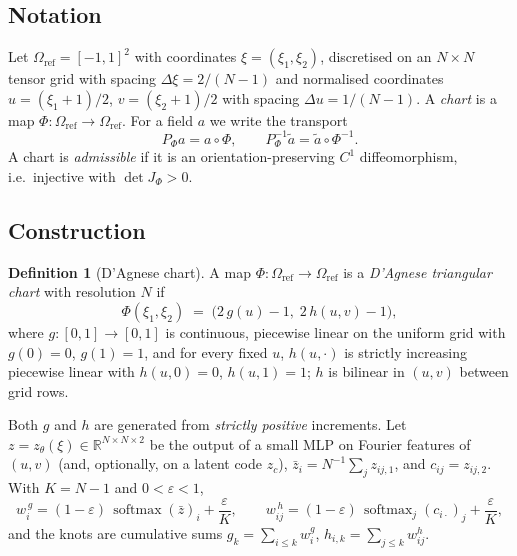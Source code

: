 \documentclass[11pt,a4paper]{article}
\theoremstyle{plain}
\theoremstyle{definition}
\newtheorem{definition}[theorem]{Definition}
\newcommand{\R}{\mathbb{R}}
\newcommand{\detJ}{\det J_\Phi}
\newcommand{\Om}{\Omega_{\mathrm{ref}}}
\newcommand{\Pa}{P_{\Phi}}
\begin{document}
\subsection{Notation}

Let $\Om=[-1,1]^2$ with coordinates $\xi=(\xi_1,\xi_2)$, discretised on an
$N\times N$ tensor grid with spacing $\Delta\xi=2/(N-1)$ and normalised
coordinates $u=(\xi_1+1)/2$, $v=(\xi_2+1)/2$ with spacing $\Delta u=1/(N-1)$.
A \emph{chart} is a map $\Phi:\Om\to\Om$.  For a field $a$ we write the transport
\begin{equation}
  \Pa a = a\circ\Phi,
  \qquad
  \Pa^{-1}\tilde a = \tilde a\circ\Phi^{-1}.
\end{equation}
A chart is \emph{admissible} if it is an orientation-preserving $C^1$
diffeomorphism, i.e.\ injective with $\detJ>0$.

\subsection{Construction}

\begin{definition}[D'Agnese chart]
\label{def:chart}
A map $\Phi:\Om\to\Om$ is a \emph{D'Agnese triangular chart} with resolution
$N$ if
\begin{equation}
  \Phi(\xi_1,\xi_2) \;=\; \big(2\,g(u)-1,\; 2\,h(u,v)-1\big),
\end{equation}
where $g:[0,1]\to[0,1]$ is continuous, piecewise linear on the uniform grid with
$g(0)=0$, $g(1)=1$, and for every fixed $u$, $h(u,\cdot)$ is strictly increasing
piecewise linear with $h(u,0)=0$, $h(u,1)=1$; $h$ is bilinear in $(u,v)$ between
grid rows.
\end{definition}

Both $g$ and $h$ are generated from \emph{strictly positive} increments.  Let
$z=z_\theta(\xi)\in\R^{N\times N\times 2}$ be the output of a small MLP on
Fourier features of $(u,v)$ (and, optionally, on a latent code $z_c$),
$\bar z_i = N^{-1}\sum_j z_{ij,1}$, and $c_{ij}=z_{ij,2}$.  With $K=N-1$ and
$0<\varepsilon<1$,
\begin{equation}
\label{eq:positive}
  w^{\,g}_i = (1-\varepsilon)\,\operatorname{softmax}(\bar z)_i + \frac{\varepsilon}{K},
  \qquad
  w^{\,h}_{ij} = (1-\varepsilon)\,\operatorname{softmax}_j(c_{i\cdot})_j + \frac{\varepsilon}{K},
\end{equation}
and the knots are cumulative sums $g_k=\sum_{i\le k} w^g_i$,
$h_{i,k}=\sum_{j\le k} w^h_{ij}$.
\end{document}
